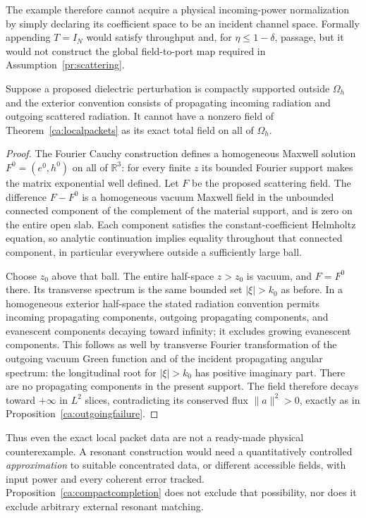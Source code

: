 The example therefore cannot acquire a physical incoming-power
normalization by simply declaring its coefficient space to be an incident
channel space.  Formally appending $T=I_N$ would satisfy throughput and,
for $\eta\leq1-\delta$, passage, but it would not construct the global
field-to-port map required in Assumption~\ref{pr:scattering}.

\begin{proposition}
\label{ca:compactcompletion}
Suppose a proposed dielectric perturbation is compactly supported outside
$\Omega_h$ and the exterior convention consists of propagating incoming
radiation and outgoing scattered radiation.  It cannot have a nonzero
field of Theorem~\ref{ca:localpackets} as its exact total field on all of
$\Omega_h$.
\end{proposition}
\begin{proof}
The Fourier Cauchy construction defines a homogeneous Maxwell solution
$F^0=(e^0,h^0)$ on all of $\mathbb R^3$: for every finite $z$ its bounded
Fourier support makes the matrix exponential well defined.  Let $F$ be
the proposed scattering field.  The difference $F-F^0$ is a homogeneous
vacuum Maxwell field in the unbounded connected component of the
complement of the material support, and is zero on the entire open slab.
Each component satisfies the constant-coefficient Helmholtz equation,
so analytic continuation implies equality throughout that connected
component, in particular everywhere outside a sufficiently large ball.

Choose $z_0$ above that ball.  The entire half-space $z>z_0$ is vacuum,
and $F=F^0$ there.  Its transverse spectrum is the same bounded set
$|\xi|>k_0$ as before.  In a homogeneous exterior half-space the stated
radiation convention permits incoming propagating components, outgoing
propagating components, and evanescent components decaying toward
infinity; it excludes growing evanescent components.  This follows as
well by transverse Fourier transformation of the outgoing vacuum Green
function and of the incident propagating angular spectrum: the
longitudinal root for $|\xi|>k_0$ has positive imaginary part.
There are no propagating components in the present support.  The field
therefore decays toward $+\infty$ in $L^2$ slices, contradicting its
conserved flux $\|a\|^2>0$, exactly as in
Proposition~\ref{ca:outgoingfailure}.
\end{proof}

Thus even the exact local packet data are not a ready-made physical
counterexample.  A resonant construction would need a quantitatively
controlled \emph{approximation} to suitable concentrated data, or
different accessible fields, with input power and every coherent error
tracked.  Proposition~\ref{ca:compactcompletion} does not exclude that
possibility, nor does it exclude arbitrary external resonant matching.

